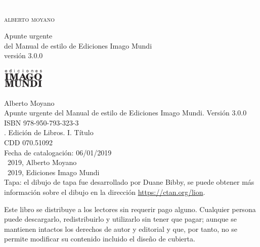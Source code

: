 \documentclass{book}
\begin{document}
\newpage
\thispagestyle{empty}
{\textcolor{white}{.}}\\

\newpage
\thispagestyle{empty}
\begin{center}
\large{\textsc{alberto moyano}} \\

\vfill

\Large{Apunte urgente\\ del Manual de estilo de Ediciones Imago Mundi}\\
\vspace{12pt}
\large{versión 3.0.0}\\

\vfill

\includegraphics[width=20mm]{logo-imago-cmyk.pdf}
\end{center}

\newpage
\thispagestyle{empty}
\noindent Alberto Moyano\\
\noindent Apunte urgente del Manual de estilo de Ediciones Imago Mundi. Versión 3.0.0\\
\noindent ISBN 978-950-793-323-3\\
. Edición de Libros. I. Título \\
\noindent CDD 070.51092 \\
\noindent Fecha de catalogación: 06/01/2019\\
\noindent \textcopyright~2019, Alberto Moyano\\
\noindent \textcopyright~2019, Ediciones Imago Mundi\\
\noindent Tapa: el dibujo de tapa fue desarrollado por Duane Bibby, se puede obtener más información sobre el dibujo en la dirección \url{https://ctan.org/lion}.\\

\vfill

\begin{mdframed}[linewidth=.5pt,linecolor=black!30,roundcorner=3pt,backgroundcolor=yellow!15]
\noindent Este libro se distribuye a los lectores sin requerir pago alguno. Cualquier persona puede descargarlo, redistribuirlo y utilizarlo sin tener que pagar; aunque se mantienen intactos los derechos de autor y editorial y que, por tanto, no se permite modificar su contenido incluido el diseño de cubierta.
\end{mdframed}
\end{document}
